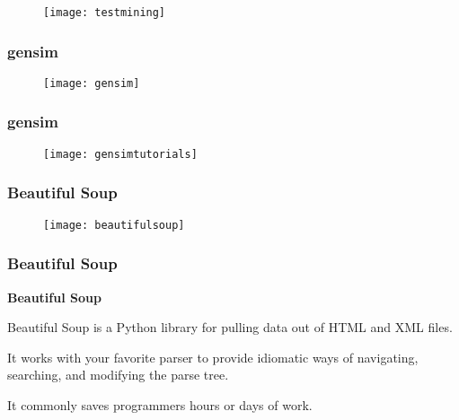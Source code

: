 \documentclass[MASTER.tex]{subfiles}
\begin{document}
 
\begin{figure}
\centering
\texttt{[image: testmining]}

\end{figure}
 
 
 
 
 \frametitle{gensim}
 \begin{figure}
  \centering
  \texttt{[image: gensim]}

 \end{figure}
 
 
 \frametitle{gensim}
\begin{figure}
 \centering
 \texttt{[image: gensimtutorials]}

\end{figure}
 
 
 \frametitle{Beautiful Soup}
 \begin{figure}
\centering
\texttt{[image: beautifulsoup]}

\end{figure}

 
 
\frametitle{Beautiful Soup}
\textbf{Beautiful Soup} 
 
 
\item Beautiful Soup is a Python library for pulling data out of HTML and XML files. 
\item It works with your favorite parser to provide idiomatic ways of navigating, searching, and modifying the parse tree. 
\item It commonly saves programmers hours or days of work.
 
 
\end{document}
